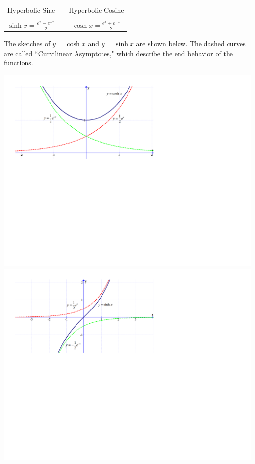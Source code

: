 \documentclass[12pt]{article}
\begin{document}
\begin{enumerate}
\begin{center}
\begin{tabular}{ccc}
Hyperbolic Sine & & Hyperbolic Cosine\\
& & \\
$\sinh{x}=\frac{e^x-e^{-x}}{2}$ & \hspace{1 cm} & $\cosh{x}=\frac{e^x+e^{-x}}{2}$
\end{tabular}
\end{center}

\smallskip

The sketches of $y=\cosh{x}$ and $y=\sinh{x}$ are shown below.  The dashed curves are called ``Curvilinear Asymptotes," which describe the end behavior of the functions.
\begin{center}
\includegraphics[scale=0.6]{cosh.pdf}\\
\vspace{0.5 cm}
\includegraphics[scale=0.6]{sinh.pdf}
\end{center}


\end{enumerate}
\end{document}
